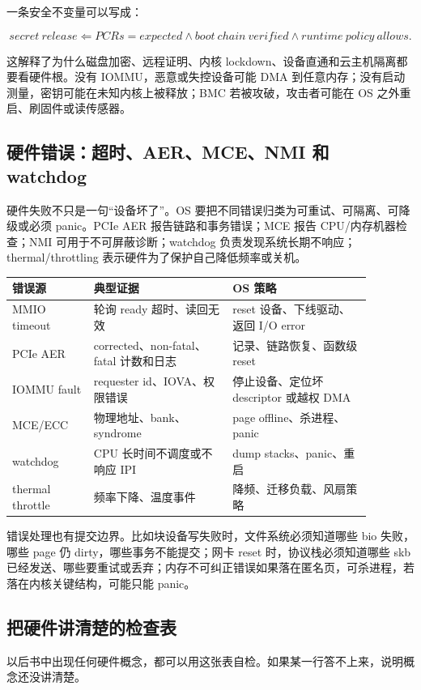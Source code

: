 一条安全不变量可以写成：

\[
secret\ release
\Leftarrow
PCRs=expected \land boot\ chain\ verified
\land runtime\ policy\ allows.
\]

这解释了为什么磁盘加密、远程证明、内核 lockdown、设备直通和云主机隔离都要看硬件根。没有 IOMMU，恶意或失控设备可能 DMA 到任意内存；没有启动测量，密钥可能在未知内核上被释放；BMC 若被攻破，攻击者可能在 OS 之外重启、刷固件或读传感器。

\subsection{硬件错误：超时、AER、MCE、NMI 和 watchdog}

硬件失败不只是一句“设备坏了”。OS 要把不同错误归类为可重试、可隔离、可降级或必须 panic。PCIe AER 报告链路和事务错误；MCE 报告 CPU/内存机器检查；NMI 可用于不可屏蔽诊断；watchdog 负责发现系统长期不响应；thermal/throttling 表示硬件为了保护自己降低频率或关机。

\begin{longtable}{p{0.20\linewidth}p{0.34\linewidth}p{0.34\linewidth}}
\toprule
错误源 & 典型证据 & OS 策略 \\
\midrule
MMIO timeout & 轮询 ready 超时、读回无效 & reset 设备、下线驱动、返回 I/O error \\
PCIe AER & corrected、non-fatal、fatal 计数和日志 & 记录、链路恢复、函数级 reset \\
IOMMU fault & requester id、IOVA、权限错误 & 停止设备、定位坏 descriptor 或越权 DMA \\
MCE/ECC & 物理地址、bank、syndrome & page offline、杀进程、panic \\
watchdog & CPU 长时间不调度或不响应 IPI & dump stacks、panic、重启 \\
thermal throttle & 频率下降、温度事件 & 降频、迁移负载、风扇策略 \\
\bottomrule
\end{longtable}

错误处理也有提交边界。比如块设备写失败时，文件系统必须知道哪些 bio 失败，哪些 page 仍 dirty，哪些事务不能提交；网卡 reset 时，协议栈必须知道哪些 skb 已经发送、哪些要重试或丢弃；内存不可纠正错误如果落在匿名页，可杀进程，若落在内核关键结构，可能只能 panic。

\subsection{把硬件讲清楚的检查表}

以后书中出现任何硬件概念，都可以用这张表自检。如果某一行答不上来，说明概念还没讲清楚。


